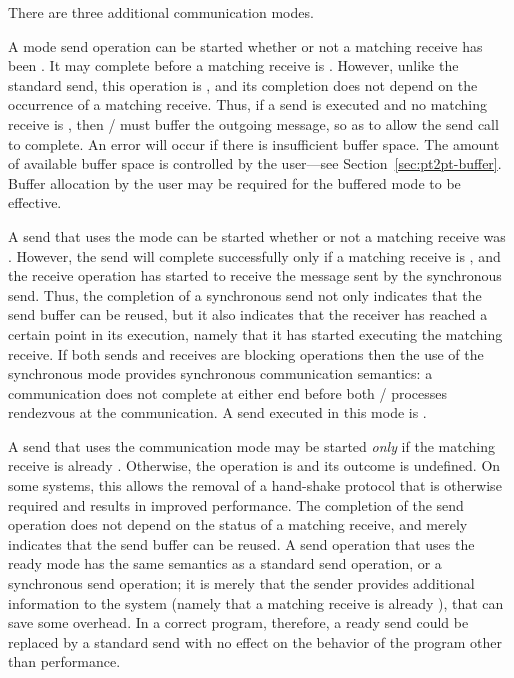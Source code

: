There are three additional communication modes.

A  mode send operation can be started whether or not a
matching receive has been .
It may complete before a matching receive is .  However, unlike
the standard send, this operation is , and its
completion does not depend on the occurrence of a matching receive.  Thus, if a
send is executed and no matching receive is , then \MPI/ must buffer the
outgoing message, so as to allow the send call to complete.  An error will
occur if there is insufficient buffer space.  The amount of available buffer
space is controlled by the user---see Section~\ref{sec:pt2pt-buffer}.
Buffer allocation by the user may be required for the buffered mode to be
effective.

A send that uses the  mode can be started whether or
not a matching receive was .  However, the send will complete
successfully only if a matching receive is , and the
receive operation has started to receive the message sent by the
synchronous send.
Thus, the completion of a synchronous send not only indicates that the
send buffer can be reused, but
it
also indicates that the receiver has
reached a certain point in its execution, namely that it has started
executing the matching receive.  If both sends and receives are
blocking operations then the use of the synchronous mode provides
synchronous communication semantics: a communication does not complete
at either end before both \MPI/ processes rendezvous at the
communication.  A send executed in this mode is .

A send that uses the  communication mode
may be started \emph{only} if the matching receive is already .
Otherwise, the operation is  and its outcome is undefined.
On some systems, this allows the removal of a hand-shake
protocol that is otherwise required and results in improved
performance.
The completion of the send operation does not depend on the
status of a matching receive, and merely indicates that the send
buffer can be reused.  A send operation that uses the ready mode has
the same semantics as a standard send operation, or a synchronous send
operation; it is merely that the sender provides additional
information to the system (namely that a matching receive is already
), that can save some overhead.  In a correct program, therefore, a
ready send could be replaced by a standard send with no effect on the
behavior of the program other than performance.


